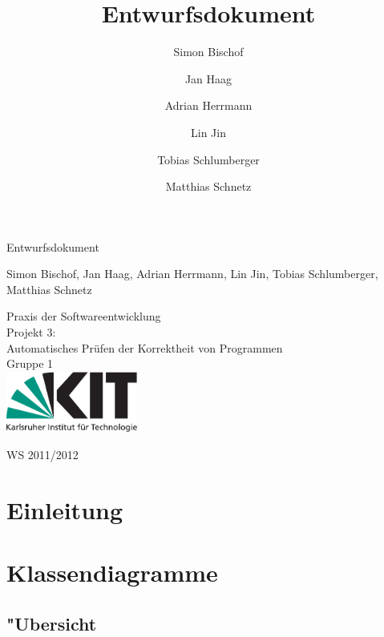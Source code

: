 \documentclass[10pt,a4paper,titlepage]{article}
\title{Entwurfsdokument}
\author{Simon Bischof \and Jan Haag \and Adrian Herrmann \and Lin Jin \and Tobias Schlumberger \and Matthias Schnetz}
\begin{document}
\thispagestyle{empty}
\vspace*{4cm}
\begin{center}
\begin {huge}
Entwurfsdokument\\
\end{huge}
Simon Bischof, Jan Haag, Adrian Herrmann, Lin Jin, Tobias Schlumberger, Matthias Schnetz\\
\vspace{3cm}
\begin{huge}
Praxis der Softwareentwicklung \\
Projekt 3:\\
Automatisches Pr\"{u}fen der Korrektheit von Programmen\\
Gruppe 1\\
\vspace{2cm}
\includegraphics[height=2cm]{images/Logo.pdf}\\[0.5cm]
\end{huge}
\begin{huge}
WS 2011/2012
\end{huge}
\end{center}
\newpage
\tableofcontents
\newpage

\section{Einleitung}

\section{Klassendiagramme}

\subsection{"Ubersicht}
\end{document}
